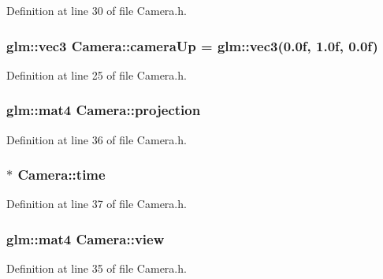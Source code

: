 Definition at line 30 of file Camera.\+h.

\hypertarget{class_camera_a517042b127746997f9472d51bbae2610}{}
\subsubsection[{camera\+Up}]{\setlength{\rightskip}{0pt plus 5cm}glm\+::vec3 Camera\+::camera\+Up = glm\+::vec3(0.\+0f, 1.\+0f, 0.\+0f)}\label{class_camera_a517042b127746997f9472d51bbae2610}


Definition at line 25 of file Camera.\+h.

\hypertarget{class_camera_a43555a0ae83f9ec696ee257e5fd48cf2}{}
\subsubsection[{projection}]{\setlength{\rightskip}{0pt plus 5cm}glm\+::mat4 Camera\+::projection}\label{class_camera_a43555a0ae83f9ec696ee257e5fd48cf2}


Definition at line 36 of file Camera.\+h.

\hypertarget{class_camera_a5944842935bf511fb1720f50f0f426da}{}
\subsubsection[{time}]{$\ast$ Camera\+::time}\label{class_camera_a5944842935bf511fb1720f50f0f426da}


Definition at line 37 of file Camera.\+h.

\hypertarget{class_camera_add93fedd6b9a6a6e2c784aeda624de83}{}
\subsubsection[{view}]{\setlength{\rightskip}{0pt plus 5cm}glm\+::mat4 Camera\+::view}\label{class_camera_add93fedd6b9a6a6e2c784aeda624de83}


Definition at line 35 of file Camera.\+h.

\hypertarget{class_camera_a0c41085cad802bae1026706d23688034}{}
